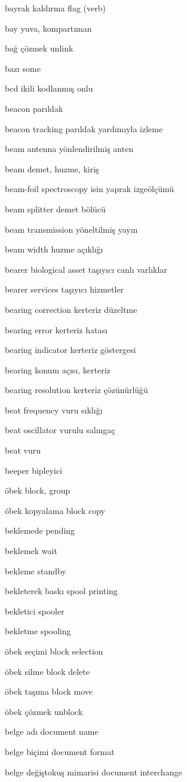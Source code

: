 \documentclass[12pt,fleqn]{article}\usepackage{../../common}
\begin{document}
bayrak kaldırma flag (verb)

bay yuva, kompartıman

bağ çözmek unlink

bazı some

bcd ikili kodlanmış onlu

beacon parıldak

beacon tracking parıldak yardımıyla izleme

beam antenna yönlendirilmiş anten

beam demet, huzme, kiriş

beam-foil spectroscopy isin yaprak izgeölçümü

beam splitter demet bölücü

beam transmission yöneltilmiş yayın

beam width huzme açıklığı

bearer biological asset taşıyıcı canlı varlıklar

bearer services taşıyıcı hizmetler

bearing correction kerteriz düzeltme

bearing error kerteriz hatası

bearing indicator kerteriz göstergesi

bearing konum açısı, kerteriz

bearing resolution kerteriz çözünürlüğü

beat frequency vuru sıklığı

beat oscillator vurulu salıngaç

beat vuru

beeper bipleyici

öbek block, group

öbek kopyalama block copy

beklemede pending

beklemek wait

bekleme standby

bekleterek baskı spool printing

bekletici spooler

bekletme spooling

öbek seçimi block selection

öbek silme block delete

öbek taşıma block move

öbek çözmek unblock

belge adı document name

belge biçimi document format

belge değiştokuş mimarisi document interchange
\end{document}
